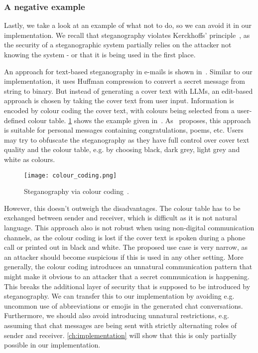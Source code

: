 \subsubsection{A negative example}
\label{sec:aNegativeExample}
Lastly, we take a look at an example of what not to do, so we can avoid it in our implementation. We recall that steganography violates Kerckhoffs' principle~\cite{andersonLimitsSteganography1998}, as the security of a steganographic system partially relies on the attacker not knowing the system - or that it is being used in the first place.

An approach for text-based steganography in e-mails is shown in~\cite{malikHighCapacityText2017}. Similar to our implementation, it uses Huffman compression to convert a secret message from string to binary. But instead of generating a cover text with \glspl{LLM}, an edit-based approach is chosen by taking the cover text from user input. Information is encoded by colour coding the cover text, with colours being selected from a user-defined colour table. \cref{fig:colourCoding} shows the example given in~\cite{malikHighCapacityText2017}. As~\cite{malikHighCapacityText2017} proposes, this approach is suitable for personal messages containing congratulations, poems, etc. Users may try to obfuscate the steganography as they have full control over cover text quality and the colour table, e.g. by choosing black, dark grey, light grey and white as colours.

\begin{figure}
    \begin{wide}
        \centering
        \captionsetup{width=\linewidth}
        \texttt{[image: colour\_coding.png]}
        \caption[Colour coding]{Steganography via colour coding~\cite{malikHighCapacityText2017}.}
        \label{fig:colourCoding}
    \end{wide}
\end{figure}

However, this doesn't outweigh the disadvantages. The colour table has to be exchanged between sender and receiver, which is difficult as it is not natural language. This approach also is not robust when using non-digital communication channels, as the colour coding is lost if the cover text is spoken during a phone call or printed out in black and white. The proposed use case is very narrow, as an attacker should become suspicious if this is used in any other setting. More generally, the colour coding introduces an unnatural communication pattern that might make it obvious to an attacker that a secret communication is happening. This breaks the additional layer of security that is supposed to be introduced by steganography. We can transfer this to our implementation by avoiding e.g. uncommon use of abbreviations or emojis in the generated chat conversations. Furthermore, we should also avoid introducing unnatural restrictions, e.g. assuming that chat messages are being sent with strictly alternating roles of sender and receiver. \cref{ch:implementation} will show that this is only partially possible in our implementation.


